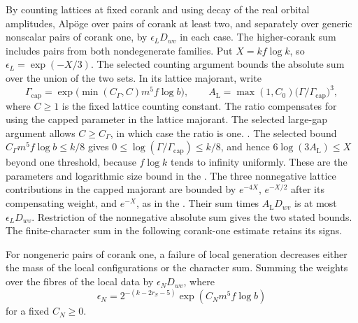 \leavevmode{}%
By counting lattices at fixed corank and using decay of the real
orbital amplitudes, Alp\"oge
over pairs of corank at least two, and separately over generic
nonscalar pairs of corank one, by \(\epsilon_L D_{wv}\) in each case.
The higher-corank sum includes pairs from both nondegenerate families.
Put \(X=kf\log k\), so \(\epsilon_L=\exp(-X/3)\).
The selected counting argument bounds the absolute sum over the
union of the two sets. In its lattice majorant, write
\[
 \Gamma_{\mathrm{cap}}=\exp\bigl(\min(C_\Gamma,C)m^5 f\log b\bigr),
 \qquad A_{\mathrm L}=\max(1,C_0)\bigl(\Gamma/\Gamma_{\mathrm{cap}}\bigr)^3,
\]
where \(C\ge1\) is the fixed lattice counting constant.
The ratio compensates for using the capped parameter in the lattice
majorant. The selected large-gap argument allows \(C\ge C_\Gamma\),
in which case the ratio is one.
.
The selected bound \(C_\Gamma m^5 f\log b\le k/8\) gives
\(0\le\log(\Gamma/\Gamma_{\mathrm{cap}})\le k/8\), and hence
\(6\log(3A_{\mathrm L})\le X\) beyond one threshold, because \(f\log k\)
tends to infinity uniformly. These are the parameters and logarithmic
size bound in the
.
The three nonnegative lattice contributions in the capped majorant are
bounded by \(e^{-4X}\), \(e^{-X/2}\) after its compensating weight,
and \(e^{-X}\), as in the
.
Their sum times \(A_{\mathrm L}D_{wv}\) is at most \(\epsilon_LD_{wv}\).
Restriction of the nonnegative absolute sum gives the two stated
bounds. The finite-character sum in the following corank-one
estimate retains its signs.

For nongeneric pairs of corank one, a failure of local generation
decreases either the mass of the local configurations or the
character sum. Summing the weights over the fibres of the local data
by \(\epsilon_N D_{wv}\), where
\[
 \epsilon_N=2^{-(k-2r_S-5)}\exp(C_Nm^5 f\log b)
\]
for a fixed \(C_N\ge0\).

